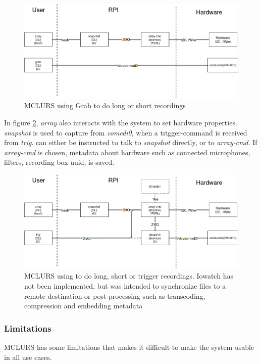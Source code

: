 \begin{figure}[h!]
	\centering
	\includegraphics[width=\textwidth]{figures/mclurs_app1}
	\caption{MCLURS using Grab to do long or short recordings} \label{fig:mclurs:grab}
\end{figure}

In figure \ref{fig:mclurs:snapshot}, \textit{array} also interacts with the system to set hardware properties. \textit{snapshot} is used to capture from \textit{comedi0}, when a trigger-command is received from \textit{trig}.
 can either be instructed to talk to \textit{snapshot} directly, or to \textit{array-cmd}. If \textit{array-cmd} is chosen, metadata about hardware such as connected microphones, filters, recording box uuid, is saved.

\begin{figure}[h!]
	\centering
	\includegraphics[width=\textwidth]{figures/mclurs_app2}
	\caption{MCLURS using  to do long, short or trigger recordings. Iowatch has not been implemented, but was intended to synchronize files to a remote destination or post-processing such as transcoding, compression and embedding metadata} \label{fig:mclurs:snapshot}
\end{figure}

\subsubsection{Limitations} \label{sec:existingsystem:limitations}
MCLURS has some limitations that makes it difficult to make the system usable in all use cases.  \\

